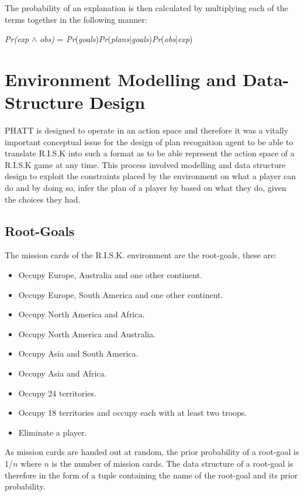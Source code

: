 \documentclass[parskip]{cs4rep}
\begin{document}
The probability of an explanation is then calculated by multiplying each of the terms together in the following manner: \newline

\centerline{
\textit{Pr(exp} $\wedge$ \textit{obs)} = \textit{Pr}(\textit{goals})\textit{Pr}(\textit{plans}|\textit{goals})\textit{Pr}(\textit{obs}|\textit{exp})
}

\section{Environment Modelling and Data-Structure Design}

PHATT is designed to operate in an action space and therefore it was a vitally important conceptual issue for the design of plan recognition agent to be able to translate R.I.S.K into such a format as to be able represent the action space of a R.I.S.K game at any time. This process involved modelling and data structure design to exploit the constraints placed by the environment on what a player can do and by doing so, infer the plan of a player by based on what they do, given the choices they had.

\subsection{Root-Goals}

The mission cards of the R.I.S.K. environment are the root-goals, these are:

\begin{itemize}
\item
Occupy Europe, Australia and one other continent.
\item
Occupy Europe, South America and one other continent.
\item
Occupy North America and Africa.
\item
Occupy North America and Australia.
\item
Occupy Asia and South America.
\item
Occupy Asia and Africa.
\item
Occupy 24 territories.
\item
Occupy 18 territories and occupy each with at least two troops.
\item
Eliminate a player.
\end{itemize}

As mission cards are handed out at random, the prior probability of a root-goal is 1/$n$ where $n$ is the number of mission cards. The data structure of a root-goal is therefore in the form of a tuple containing the name of the root-goal and its prior probability.
\end{document}
